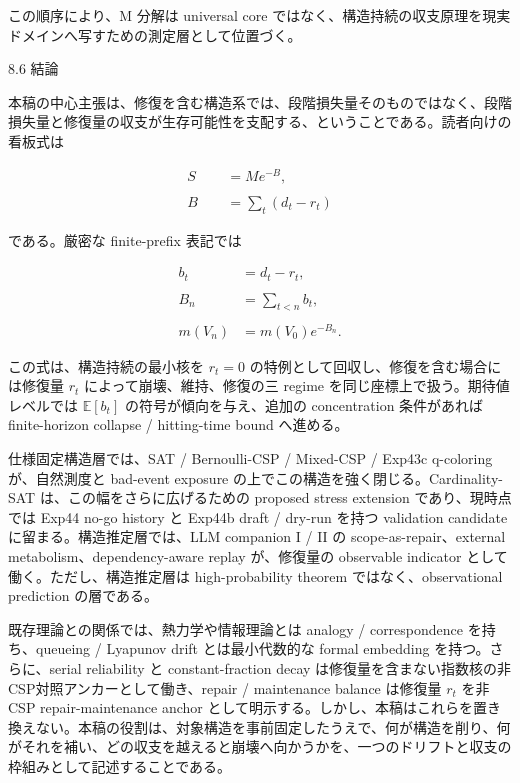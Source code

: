 \documentclass[12pt,a4paper]{article}
\begin{document}
この順序により、M 分解は universal core ではなく、構造持続の収支原理を現実ドメインへ写すための測定層として位置づく。

8.6 結論

本稿の中心主張は、修復を含む構造系では、段階損失量そのものではなく、段階損失量と修復量の収支が生存可能性を支配する、ということである。読者向けの看板式は

\[
\begin{aligned}
S &= M e^{-B}, \\
\qquad \\
B&=\sum_{t}(d_{t}-r_{t})
\end{aligned}
\]

である。厳密な finite-prefix 表記では

\[
\begin{aligned}
b_{t}&=d_{t}-r_{t}, \\
\qquad \\
B_{n}&=\sum_{t<n}b_{t}, \\
\qquad \\
m(V_{n})&=m(V_0)e^{-B_{n}}.
\end{aligned}
\]

この式は、構造持続の最小核を \(r_{t}=0\) の特例として回収し、修復を含む場合には修復量 \(r_{t}\) によって崩壊、維持、修復の三 regime を同じ座標上で扱う。期待値レベルでは \(\mathbb E[b_{t}]\) の符号が傾向を与え、追加の concentration 条件があれば finite-horizon collapse / hitting-time bound へ進める。

仕様固定構造層では、SAT / Bernoulli-CSP / Mixed-CSP / Exp43c q-coloring が、自然測度と bad-event exposure の上でこの構造を強く閉じる。Cardinality-SAT は、この幅をさらに広げるための proposed stress extension であり、現時点では Exp44 no-go history と Exp44b draft / dry-run を持つ validation candidate に留まる。構造推定層では、LLM companion I / II の scope-as-repair、external metabolism、dependency-aware replay が、修復量の observable indicator として働く。ただし、構造推定層は high-probability theorem ではなく、observational prediction の層である。

既存理論との関係では、熱力学や情報理論とは analogy / correspondence を持ち、queueing / Lyapunov drift とは最小代数的な formal embedding を持つ。さらに、serial reliability と constant-fraction decay は修復量を含まない指数核の非CSP対照アンカーとして働き、repair / maintenance balance は修復量 \(r_{t}\) を非CSP repair-maintenance anchor として明示する。しかし、本稿はこれらを置き換えない。本稿の役割は、対象構造を事前固定したうえで、何が構造を削り、何がそれを補い、どの収支を越えると崩壊へ向かうかを、一つのドリフトと収支の枠組みとして記述することである。
\end{document}
